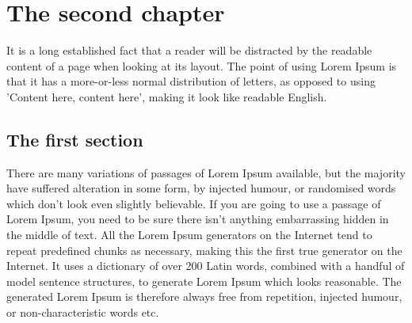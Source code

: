 
\chapter{The second chapter}

It is a long established fact that a reader will be distracted by the readable content of a page when looking at its layout. The point of using Lorem Ipsum is that it has a more-or-less normal distribution of letters, as opposed to using 'Content here, content here', making it look like readable English. 

\section{The first section}

There are many variations of passages of Lorem Ipsum available, but the majority have suffered alteration in some form, by injected humour, or randomised words which don't look even slightly believable. If you are going to use a passage of Lorem Ipsum, you need to be sure there isn't anything embarrassing hidden in the middle of text. All the Lorem Ipsum generators on the Internet tend to repeat predefined chunks as necessary, making this the first true generator on the Internet. It uses a dictionary of over 200 Latin words, combined with a handful of model sentence structures, to generate Lorem Ipsum which looks reasonable. The generated Lorem Ipsum is therefore always free from repetition, injected humour, or non-characteristic words etc.
